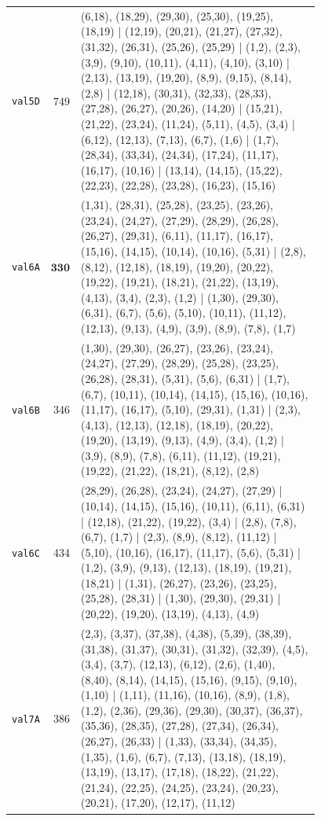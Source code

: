 \begin{landscape}
\begin{longtable}{lr>{\tiny\raggedright\arraybackslash}p{0.78\linewidth}}
\texttt{val5D} & 749 & (6,18), (18,29), (29,30), (25,30), (19,25), (18,19) | (12,19), (20,21), (21,27), (27,32), (31,32), (26,31), (25,26), (25,29) | (1,2), (2,3), (3,9), (9,10), (10,11), (4,11), (4,10), (3,10) | (2,13), (13,19), (19,20), (8,9), (9,15), (8,14), (2,8) | (12,18), (30,31), (32,33), (28,33), (27,28), (26,27), (20,26), (14,20) | (15,21), (21,22), (23,24), (11,24), (5,11), (4,5), (3,4) | (6,12), (12,13), (7,13), (6,7), (1,6) | (1,7), (28,34), (33,34), (24,34), (17,24), (11,17), (16,17), (10,16) | (13,14), (14,15), (15,22), (22,23), (22,28), (23,28), (16,23), (15,16) \\[2pt]
\texttt{val6A} & $\mathbf{330}$ & (1,31), (28,31), (25,28), (23,25), (23,26), (23,24), (24,27), (27,29), (28,29), (26,28), (26,27), (29,31), (6,11), (11,17), (16,17), (15,16), (14,15), (10,14), (10,16), (5,31) | (2,8), (8,12), (12,18), (18,19), (19,20), (20,22), (19,22), (19,21), (18,21), (21,22), (13,19), (4,13), (3,4), (2,3), (1,2) | (1,30), (29,30), (6,31), (6,7), (5,6), (5,10), (10,11), (11,12), (12,13), (9,13), (4,9), (3,9), (8,9), (7,8), (1,7) \\[2pt]
\texttt{val6B} & 346 & (1,30), (29,30), (26,27), (23,26), (23,24), (24,27), (27,29), (28,29), (25,28), (23,25), (26,28), (28,31), (5,31), (5,6), (6,31) | (1,7), (6,7), (10,11), (10,14), (14,15), (15,16), (10,16), (11,17), (16,17), (5,10), (29,31), (1,31) | (2,3), (4,13), (12,13), (12,18), (18,19), (20,22), (19,20), (13,19), (9,13), (4,9), (3,4), (1,2) | (3,9), (8,9), (7,8), (6,11), (11,12), (19,21), (19,22), (21,22), (18,21), (8,12), (2,8) \\[2pt]
\texttt{val6C} & 434 & (28,29), (26,28), (23,24), (24,27), (27,29) | (10,14), (14,15), (15,16), (10,11), (6,11), (6,31) | (12,18), (21,22), (19,22), (3,4) | (2,8), (7,8), (6,7), (1,7) | (2,3), (8,9), (8,12), (11,12) | (5,10), (10,16), (16,17), (11,17), (5,6), (5,31) | (1,2), (3,9), (9,13), (12,13), (18,19), (19,21), (18,21) | (1,31), (26,27), (23,26), (23,25), (25,28), (28,31) | (1,30), (29,30), (29,31) | (20,22), (19,20), (13,19), (4,13), (4,9) \\[2pt]
\texttt{val7A} & 386 & (2,3), (3,37), (37,38), (4,38), (5,39), (38,39), (31,38), (31,37), (30,31), (31,32), (32,39), (4,5), (3,4), (3,7), (12,13), (6,12), (2,6), (1,40), (8,40), (8,14), (14,15), (15,16), (9,15), (9,10), (1,10) | (1,11), (11,16), (10,16), (8,9), (1,8), (1,2), (2,36), (29,36), (29,30), (30,37), (36,37), (35,36), (28,35), (27,28), (27,34), (26,34), (26,27), (26,33) | (1,33), (33,34), (34,35), (1,35), (1,6), (6,7), (7,13), (13,18), (18,19), (13,19), (13,17), (17,18), (18,22), (21,22), (21,24), (22,25), (24,25), (23,24), (20,23), (20,21), (17,20), (12,17), (11,12) \\[2pt]

\end{longtable}
\end{landscape}
